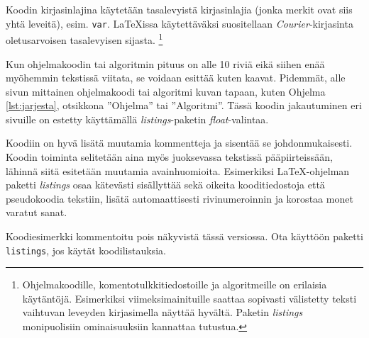 \documentclass[globalnumbering,centeredcaptions]{tutthesis/tutthesis} %
\begin{document}
Koodin kirjasinlajina käytetään tasalevyistä kirjasinlajia (jonka merkit ovat siis yhtä leveitä), esim. \texttt{var}.
LaTeXissa käytettäväksi suositellaan \emph{Courier}-kirjasinta oletusarvoisen tasalevyisen sijasta.
\footnote{Ohjelmakoodille, komentotulkkitiedostoille ja algoritmeille on erilaisia käytäntöjä.
  Esimerkiksi viimeksimainituille saattaa sopivasti välistetty teksti vaihtuvan leveyden kirjasimella näyttää hyvältä.
  Paketin \emph{listings} monipuolisiin ominaisuuksiin kannattaa tutustua.}

Kun ohjelmakoodin tai algoritmin pituus on alle 10 riviä eikä siihen enää myöhemmin tekstissä viitata, se voidaan esittää kuten kaavat.
Pidemmät, alle sivun mittainen ohjelmakoodi tai algoritmi kuvan tapaan, kuten Ohjelma \ref{lst:jarjesta}, otsikkona ''Ohjelma'' tai ''Algoritmi''.
Tässä koodin jakautuminen eri sivuille on estetty käyttämällä \emph{listings}-paketin \emph{float}-valintaa.

Koodiin on hyvä lisätä muutamia kommentteja ja sisentää se johdonmukaisesti.
Koodin toiminta selitetään aina myös juoksevassa tekstissä pääpiirteissään, lähinnä siitä esitetään muutamia avainhuomioita.
Esimerkiksi LaTeX-ohjelman paketti \emph{listings} \citep{Heinz2006, Oetiker2011} osaa kätevästi sisällyttää sekä oikeita kooditiedostoja että pseudokoodia tekstiin, lisätä automaattisesti rivinumeroinnin ja korostaa monet varatut sanat.


\iffalse %
\begin{lstlisting}[float,caption={Esimerkki ohjelmakoodin esittämisestä kuvan tapaan.},label={lst:jarjesta},language=C]
void jarjesta( Kirjainpari taulukko[], int koko )
{
  // Jarjestetaan taulukko siten, etta jokaisella kierroksella
  // valitaan alkio, joka kuuluu taulukon ensimmaiseksi ja siirretaan
  // se oikealle paikalleen.
  for( int i = 0; i < koko; ++i )
  {
    // Etsitaan pienin eli lahinna aakkosten alkua oleva
    // kirjan lopputaulukosta
    int pienimmanKohta = i;
    for( int j = i; j < koko; ++j )
    {
      if( taulukko[ j ].korvattava
          < taulukko[ pienimmanKohta ].korvattava )
      {
        pienimmanKohta = j;
      }
    }
    // Vaihdetaan pienin alkio omalle paikalleen
    Kirjainpari tmp            = taulukko[ i ];
    taulukko[ i ]              = taulukko[ pienimmanKohta ];
    taulukko[ pienimmanKohta ] = tmp;
  }
  return;
}
\end{lstlisting}
\else
\label{lst:jarjesta}
Koodiesimerkki kommentoitu pois näkyvistä tässä versiossa. Ota käyttöön paketti \texttt{listings}, jos käytät koodilistauksia.
\fi
\end{document}
